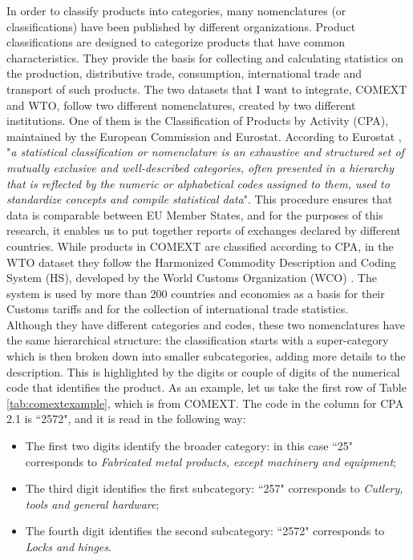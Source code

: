 In order to classify products into categories, many nomenclatures (or classifications) have been published by different organizations. Product classifications are designed to categorize products that have common characteristics. They provide the basis for collecting and calculating statistics on the production, distributive trade, consumption, international trade and transport of such products. The two datasets that I want to integrate, COMEXT and WTO, follow two different nomenclatures, created by two different institutions.
One of them is the Classification of Products by Activity (CPA), maintained by the European Commission and Eurostat.
According to Eurostat \cite{eurostat2022website}, "\textit{a statistical classification or nomenclature is an exhaustive and structured set of mutually exclusive and well-described categories, often presented in a hierarchy that is reflected by the numeric or alphabetical codes assigned to them, used to standardize concepts and compile statistical data}".
This procedure ensures that data is comparable between EU Member States, and for the purposes of this research, it enables us to put together reports of exchanges declared by different countries. While products in COMEXT are classified according to CPA, in the WTO dataset they follow the Harmonized Commodity Description and Coding System (HS), developed by the World Customs Organization (WCO) \cite{wco2022hs}. The system is used by more than 200 countries and economies as a basis for their Customs tariffs and for the collection of international trade statistics.\\
Although they have different categories and codes, these two nomenclatures have the same hierarchical structure: the classification starts with a super-category which is then broken down into smaller subcategories, adding more details to the description. This is highlighted by the digits or couple of digits of the numerical code that identifies the product. As an example, let us take the first row of Table \ref{tab:comextexample}, which is from COMEXT. The code in the column for CPA 2.1 is ``2572", and it is read in the following way:
\begin{itemize}
    \item The first two digits identify the broader category: in this case ``25" corresponds to \textit{Fabricated metal products, except machinery and equipment};
    \item The third digit identifies the first subcategory: ``257" corresponds to \textit{Cutlery, tools and general hardware};
    \item The fourth digit identifies the second subcategory: ``2572" corresponds to \textit{Locks and hinges}.
\end{itemize}
